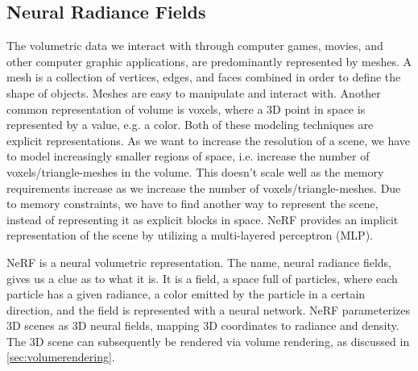 



\subsection{Neural Radiance Fields}
The volumetric data we interact with through computer games, movies, and other computer graphic applications, are predominantly represented by meshes. A mesh is a collection of vertices, edges, and faces combined in order to define the shape of objects. Meshes are easy to manipulate and interact with. Another common representation of volume is voxels, where a 3D point in space is represented by a value, e.g. a color. Both of these modeling techniques are explicit representations. As we want to increase the resolution of a scene, we have to model increasingly smaller regions of space, i.e. increase the number of voxels/triangle-meshes in the volume. This doesn't scale well as the memory requirements increase as we increase the number of voxels/triangle-meshes. Due to memory constraints, we have to find another way to represent the scene, instead of representing it as explicit blocks in space. NeRF provides an implicit representation of the scene by utilizing a multi-layered perceptron (MLP).

NeRF is a neural volumetric representation. The name, neural radiance fields, gives us a clue as to what it is. It is a field, a space full of particles, where each particle has a given radiance, a color emitted by the particle in a certain direction, and the field is represented with a neural network. NeRF parameterizes 3D scenes as 3D neural fields, mapping 3D coordinates to radiance and density. The 3D scene can subsequently be rendered via volume rendering, as discussed in \autoref{sec:volumerendering}.


